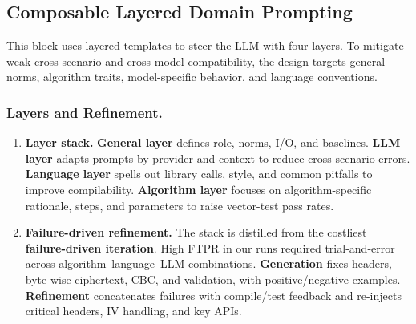 \documentclass[runningheads]{llncs}
\begin{document}
\subsection{Composable Layered Domain Prompting}
This block uses layered templates to steer the LLM with four layers. To mitigate weak cross-scenario and cross-model compatibility, the design targets general norms, algorithm traits, model-specific behavior, and language conventions.

\subsubsection{Layers and Refinement.}
\begin{enumerate}
    \item \textbf{Layer stack.} \textbf{General layer} defines role, norms, I/O, and baselines. \textbf{LLM layer} adapts prompts by provider and context to reduce cross-scenario errors. \textbf{Language layer} spells out library calls, style, and common pitfalls to improve compilability. \textbf{Algorithm layer} focuses on algorithm-specific rationale, steps, and parameters to raise vector-test pass rates.
    \item \textbf{Failure-driven refinement.} The stack is distilled from the costliest \textbf{failure-driven iteration}. High FTPR in our runs required trial-and-error across algorithm--language--LLM combinations. \textbf{Generation} fixes headers, byte-wise ciphertext, CBC, and validation, with positive/negative examples. \textbf{Refinement} concatenates failures with compile/test feedback and re-injects critical headers, IV handling, and key APIs.
\end{enumerate}
\end{document}

